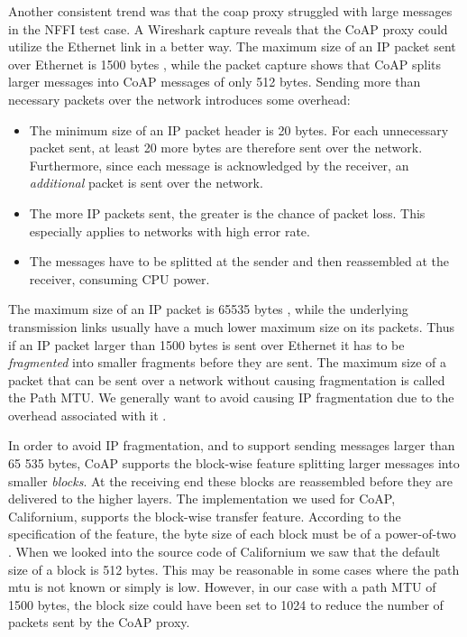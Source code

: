 Another consistent trend was that the \gls{coap} proxy struggled with large messages
in the NFFI test case. A Wireshark capture reveals that the CoAP proxy could
utilize the Ethernet link in a better way. The maximum size of an IP packet sent
over Ethernet is 1500 bytes \cite{rfc-894}, while the packet capture shows that
CoAP splits larger messages into CoAP messages of only 512 bytes. Sending more
than necessary packets over the network introduces some overhead:

\begin{itemize}

    \item The minimum size of an IP packet header is 20 bytes. For each
    unnecessary packet sent, at least 20 more bytes are therefore sent over the
    network. Furthermore, since each message is acknowledged by the receiver, an
    \textit{additional} packet is sent over the network.

    \item The more IP packets sent, the greater is the chance of packet loss.
    This especially applies to networks with high error rate.

    \item The messages have to be splitted at the sender and then reassembled at
    the receiver, consuming CPU power.

\end{itemize}

The maximum size of an IP packet is 65535 bytes \cite{rfc-791}, while the underlying
transmission links usually have a much lower maximum size on its packets. Thus if
an IP packet larger than 1500 bytes is sent over Ethernet it has to be
\textit{fragmented} into smaller fragments before they are sent. The maximum
size of a packet that can be sent over a network without causing fragmentation
is called the Path MTU. We generally want to avoid causing IP fragmentation due
to the overhead associated with it \cite{genkov2006avoiding}.

In order to avoid IP fragmentation, and to support sending messages larger than
65 535 bytes, CoAP supports the block-wise feature splitting larger messages
into smaller \textit{blocks}. At the receiving end these blocks are reassembled
before they are delivered to the higher layers. The implementation we used for
CoAP, Californium, supports the block-wise transfer feature. According to the
specification of the feature, the byte size of each block must be of a
power-of-two \cite{draft-coap-blockwise}. When we looked into the source code of
Californium we saw that the default size of a block is 512 bytes. This may be
reasonable in some cases where the path \gls{mtu} is not known or simply is low.
However, in our case with a path MTU of 1500 bytes, the block size could have
been set to 1024 to reduce the number of packets sent by the CoAP proxy.

